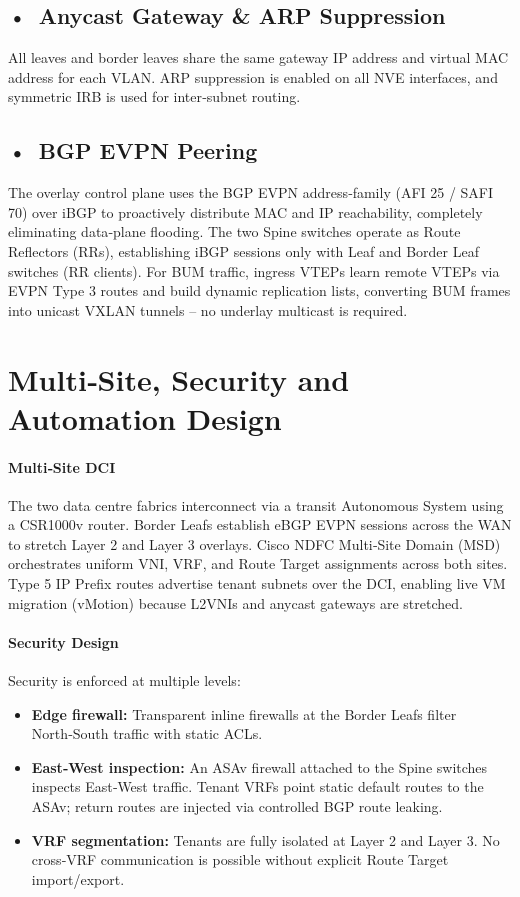 \subsection*{\mbox{•}~Anycast Gateway \& ARP Suppression}
All leaves and border leaves share the same gateway IP address and virtual MAC address for each VLAN. ARP suppression is enabled on all NVE interfaces, and symmetric IRB is used for inter‑subnet routing.

\subsection*{\mbox{•}~BGP EVPN Peering}
The overlay control plane uses the BGP EVPN address‑family (AFI 25 / SAFI 70) over iBGP to proactively distribute MAC and IP reachability, completely eliminating data‑plane flooding. The two Spine switches operate as Route Reflectors (RRs), establishing iBGP sessions only with Leaf and Border Leaf switches (RR clients). For BUM traffic, ingress VTEPs learn remote VTEPs via EVPN Type 3 routes and build dynamic replication lists, converting BUM frames into unicast VXLAN tunnels – no underlay multicast is required.

\section{Multi‑Site, Security and Automation Design}
\paragraph{Multi‑Site DCI}
The two data centre fabrics interconnect via a transit Autonomous System using a CSR1000v router. Border Leafs establish eBGP EVPN sessions across the WAN to stretch Layer 2 and Layer 3 overlays. Cisco NDFC Multi‑Site Domain (MSD) orchestrates uniform VNI, VRF, and Route Target assignments across both sites. Type 5 IP Prefix routes advertise tenant subnets over the DCI, enabling live VM migration (vMotion) because L2VNIs and anycast gateways are stretched.

\paragraph{Security Design}
Security is enforced at multiple levels:
\begin{itemize}
    \item \textbf{Edge firewall:} Transparent inline firewalls at the Border Leafs filter North‑South traffic with static ACLs.
    \item \textbf{East‑West inspection:} An ASAv firewall attached to the Spine switches inspects East‑West traffic. Tenant VRFs point static default routes to the ASAv; return routes are injected via controlled BGP route leaking.
    \item \textbf{VRF segmentation:} Tenants are fully isolated at Layer 2 and Layer 3. No cross‑VRF communication is possible without explicit Route Target import/export.
\end{itemize}

